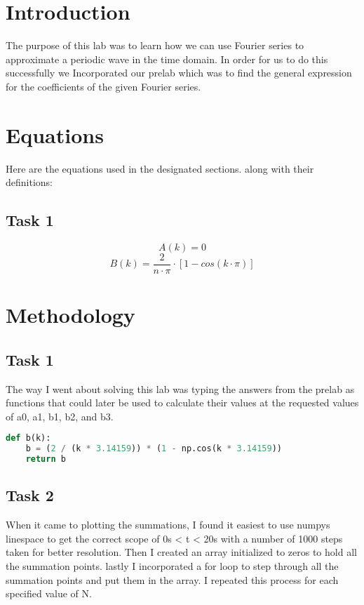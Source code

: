 \documentclass[12pt]{report}
\begin{document}
\section{Introduction}
 
The purpose of this lab was to learn how we can use Fourier series to approximate a periodic wave in the time domain. In order for us to do this successfully we Incorporated our prelab which was to find the general expression for the coefficients of the given Fourier series. 

\section{Equations}

Here are the equations used in the designated sections. along with their definitions: 

\subsection{Task 1}

\begin{equation*}
A(k) = 0
\end{equation*}
\begin{equation*}
B(k) = \frac{2}{n \cdot \pi}  \cdot [1 - cos(k \cdot \pi)]
\end{equation*}

\section{Methodology}
\subsection{Task 1}
The way I went about solving this lab was typing the answers from the prelab as functions that could later be used to calculate their values at the requested values of a0, a1, b1, b2, and b3.
\begin{lstlisting}[language=Python]
def b(k):
    b = (2 / (k * 3.14159)) * (1 - np.cos(k * 3.14159))
    return b

\end{lstlisting}

\subsection{Task 2}
When it came to plotting the summations, I found it easiest to use numpys linespace to get the correct scope of 0s < t < 20s with a number of 1000 steps taken for better resolution. Then I created an array initialized to zeros to hold all the summation points. lastly I incorporated a for loop to step through all the summation points and put them in the array. I repeated this process for each specified value of N.
\end{document}
